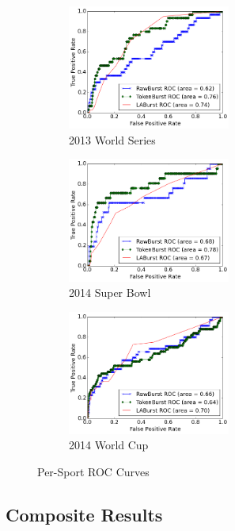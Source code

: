 \documentclass[letterpaper]{article}
\begin{document}
\begin{figure}[htb]
\centering
\begin{subfigure}[b]{0.3\textwidth}
\centering
\includegraphics[width=2.1in]{./figures/roc_2013_WorldSeries.png}
\caption{2013 World Series}
\label{fig:roc2013WorldSeries}
\end{subfigure}
\begin{subfigure}[b]{0.3\textwidth}
\centering
\includegraphics[width=2.1in]{./figures/roc_2014_SuperBowl.png}
\caption{2014 Super Bowl}
\label{fig:roc2014SuperBowl}
\end{subfigure}
\begin{subfigure}[b]{0.3\textwidth}
\centering
\includegraphics[width=2.1in]{./figures/roc_2014_WorldCup.png}
\caption{2014 World Cup}
\label{fig:roc2014WorldCup}
\end{subfigure}
\caption{Per-Sport ROC Curves}
\label{fig:joinedPerf}
\end{figure}

\subsection{Composite Results}
\end{document}
